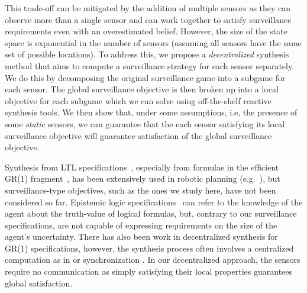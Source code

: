This trade-off can be mitigated by the addition of multiple sensors as they can observe more than a single sensor and can work together to satisfy surveillance requirements even with an overestimated belief. However, the size of the state space is exponential in the number of sensors (assuming all sensors have the same set of possible locations). To address this, we propose a \emph{decentralized} synthesis method that aims to compute a surveillance strategy for each sensor separately. We do this by decomposing the original surveillance game into a subgame for each sensor. The global surveillance objective is then broken up into a local objective for each subgame which we can solve using off-the-shelf reactive synthesis tools. We then show that, under some assumptions, i.e, the presence of some \emph{static} sensors, we can guarantee that the each sensor satisfying its local surveillance objective will guarantee satisfaction of the global surveillance objective.

Synthesis from LTL specifications~\cite{Pnueli1989}, especially from formulae in the efficient GR(1) fragment~\cite{Piterman2006}, has been extensively used in robotic planning (e.g.~\cite{wong2012,Kress2007}), but surveillance-type objectives, such as the ones we study here, have not been considered so far. Epistemic logic specifications~\cite{MeydenV98} can refer to the knowledge of the agent about the truth-value of logical formulas, but, contrary to our surveillance specifications, are not capable of expressing requirements on the size of the agent's uncertainty. There has also been work in decentralized synthesis for GR(1) specifications, however, the synthesis process often involves a centralized computation as in \cite{Kloetzer06} or synchronization \cite{Salar17,Kloetzer11}. In our decentralized approach, the sensors require no communication as simply satisfying their local properties guarantees global satisfaction.



